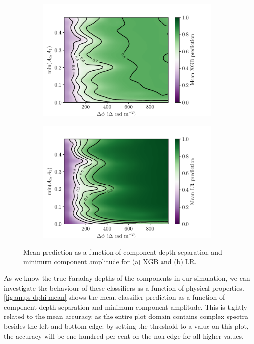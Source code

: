     \begin{figure}
      \begin{subfigure}{\linewidth}
        \includegraphics[width=\linewidth]{faraday-images/mean_xgb_prediction_dphi_amp.pdf}
        \caption{\label{fig:mean-xgb-pred}}
      \end{subfigure}
      \begin{subfigure}{\linewidth}
        \includegraphics[width=\linewidth]{faraday-images/mean_lr_prediction_dphi_amp.pdf}
        \caption{\label{fig:mean-lr-pred}}
      \end{subfigure}
      \caption{\label{fig:amps-dphi-mean} Mean prediction as a function of component depth separation and minimum component amplitude for (a) XGB and (b) LR.}
    \end{figure}

    As we know the true Faraday depths of the components in our simulation, we can investigate the behaviour of these classifiers as a function of physical properties. \autoref{fig:amps-dphi-mean} shows the mean classifier prediction as a function of component depth separation and minimum component amplitude. This is tightly related to the mean accuracy, as the entire plot domain contains complex spectra besides the left and bottom edge: by setting the threshold to a value on this plot, the accuracy will be one hundred per cent on the non-edge for all higher values.

